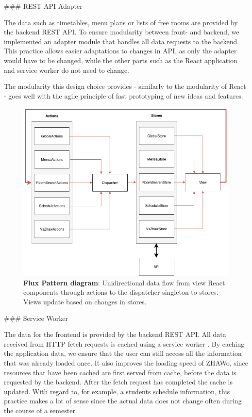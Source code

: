 \begin{markdown}
### REST API Adapter

The data such as timetables, menu plans or lists of free rooms are provided by the backend REST API. To ensure modularity between front- and backend, we implemented an adapter module that handles all data requests to the backend. This practice allows easier adaptations to changes in API, as only the adapter would have to be changed, while the other parts such as the React application and service worker do not need to change.

The modularity this design choice provides - similarly to the modularity of React - goes well with the agile principle of fast prototyping of new ideas and features.

\bigskip

\begin{figure}[H]
  \includegraphics[width=14cm, center]{../../diagrams/flux.png}
  \captionsetup{width=13.5cm}
  \caption[Flux Pattern diagram]{\textbf{Flux Pattern diagram}: Unidirectional data flow from view React components through actions to the dispatcher singleton to stores. Views update based on changes in stores.}
  \label{fig:FluxDiag}
\end{figure}

\bigskip

### Service Worker

The data for the frontend is provided by the backend REST API. All data received from HTTP fetch requests is cached using a service worker \cite{ServiceWorker}. By caching the application data, we ensure that the user can still access all the information that was already loaded once. It also improves the loading speed of ZHAWo, since resources that have been cached are first served from cache, before the data is requested by the backend. After the fetch request has completed the cache is updated. With regard to, for example, a students schedule information, this practice makes a lot of sense since the actual data does not change often during the course of a semester.


\end{markdown}

